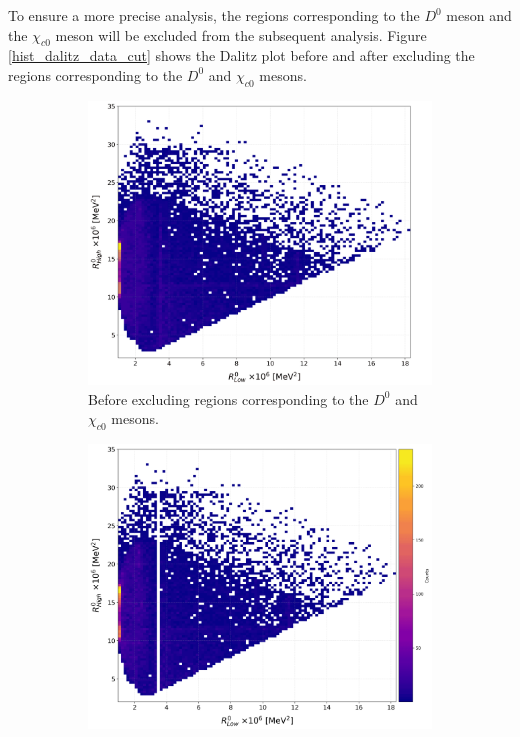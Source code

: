     To ensure a more precise analysis, the regions corresponding to the \(D^0\) meson and the \(\chi_{c0}\) meson will be excluded from the subsequent analysis. Figure \ref{hist_dalitz_data_cut} shows the Dalitz plot before and after excluding the regions corresponding to the \(D^0\) and \(\chi_{c0}\) mesons.

 

    \begin{figure}[H]
        \centering
        \begin{subfigure}[b]{0.48\textwidth}
            \centering
            \includegraphics[width=\textwidth, scale=0.35]{Figure/hist_dalitz_data_ordering_before.png}
            \caption{Before excluding regions corresponding to the \(D^0\) and \(\chi_{c0}\) mesons.}
        \end{subfigure}
        \hfill
        \begin{subfigure}[b]{0.48\textwidth}
            \centering
            \includegraphics[width=\textwidth, scale=0.35]{Figure/hist_dalitz_data_ordering_after.png}

\end{subfigure}
\end{figure}
